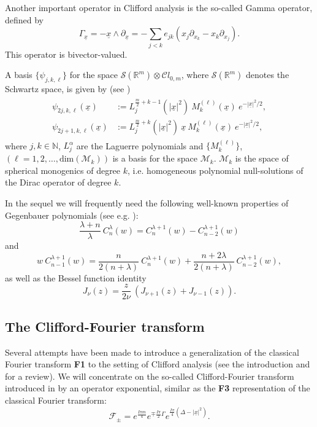 \documentclass{amsart}
\theoremstyle{remark}
\begin{document}
Another important operator in Clifford analysis is the so-called Gamma operator, defined by
\[
\Gamma_{\underline{x}} =  - {\underline{x}} \wedge {\partial_{\underline{x}}} = - \sum_{j<k} e_{jk} (x_{j} \partial_{x_{k}} - x_{k}\partial_{x_{j}}).
\]
This operator is bivector-valued.

A basis $\lbrace \psi_{j,k,\ell} \rbrace$ for the space $\mathcal{S}(\mathbb{R}^m) \otimes {\mathcal{C}} l_{0,m}$, where $\mathcal{S}(\mathbb{R}^m)$ denotes the Schwartz space, is given by (see \cite{MR926831})
\begin{align} \label{basis}
\begin{split}
\psi_{2j,k,\ell}({\underline{x}}) &:= L_{j}^{\frac{m}{2}+k-1}(|{\underline{x}}|^{2}) \ M_{k}^{(\ell)}({\underline{x}}) \ e^{-|{\underline{x}}|^{2}/2},\\
\psi_{2j+1,k,\ell}({\underline{x}}) &:= L_{j}^{\frac{m}{2}+k}(|{\underline{x}}|^{2}) \ {\underline{x}} \ M_{k}^{(\ell)}({\underline{x}}) \ e^{-|{\underline{x}}|^{2}/2},
\end{split}
\end{align}
where $j,k \in \mathbb{N}$, $L_j^{\alpha}$ are the Laguerre polynomials and $ \{M_k^{(\ell)}\}$, $(\ell=1,2, \ldots , \mathrm{dim}(\mathcal{M}_k))$ is a basis for the space $\mathcal{M}_k$. $\mathcal{M}_k$ is the space of spherical monogenics of degree $k$, i.e. homogeneous polynomial null-solutions of the Dirac operator of degree $k$.

In the sequel we will frequently need the following well-known properties of Gegenbauer polynomials (see e.g. \cite{Sz}):
\begin{equation}\label{Geg1}
\frac{\lambda + n}{\lambda} \ C_n^{\lambda}(w) = C_n^{\lambda + 1}(w) - C_{n-2}^{\lambda+1}(w)
\end{equation}
and
\begin{equation}\label{Geg2}
w \ C_{n-1}^{\lambda+1}(w) = \frac{n}{2(n+\lambda)} \ C_n^{\lambda+1}(w) + \frac{n+ 2 \lambda}{2(n+\lambda)} \ C_{n-2}^{\lambda+1}(w),
\end{equation}
as well as the Bessel function identity
\begin{equation}\label{Besselid}
J_{\nu}(z) = \frac{z}{2 \nu} \ \left(J_{\nu+1}(z) + J_{\nu-1}(z) \right).
\end{equation}
\subsection{The Clifford-Fourier transform}
Several attempts have been made to introduce a generalization of the classical Fourier transform \textbf{F1} to the setting of Clifford analysis (see the introduction and \cite{AIEP} for a review). We will concentrate on the so-called Clifford-Fourier transform introduced in \cite{MR2190678} by an operator exponential, similar as the \textbf{F3} representation of the classical Fourier transform:
\[
{\mathcal{F}}_{\pm} =  e^{ \frac{I \pi m}{4}} e^{\mp \frac{I \pi}{2}\Gamma  }e^{\frac{I \pi}{4}(\Delta - |{\underline{x}}|^{2})}. 
\]
\end{document}
